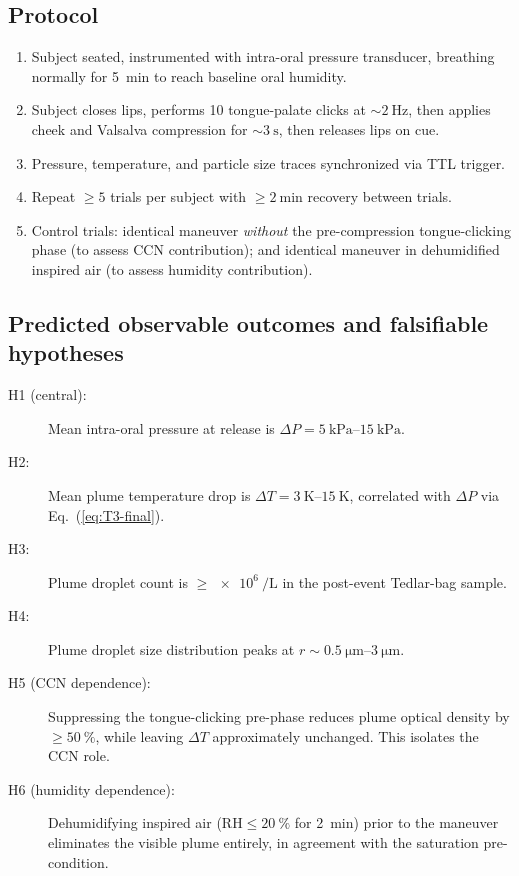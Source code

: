 \documentclass[11pt,a4paper]{article}
\theoremstyle{definition}
\theoremstyle{plain}
\begin{document}
\subsection{Protocol}

\begin{enumerate}
  \item Subject seated, instrumented with intra-oral pressure transducer, breathing normally for \SI{5}{\minute} to reach baseline oral humidity.
  \item Subject closes lips, performs 10 tongue-palate clicks at $\sim\!\SI{2}{\hertz}$, then applies cheek and Valsalva compression for $\sim\!\SI{3}{\second}$, then releases lips on cue.
  \item Pressure, temperature, and particle size traces synchronized via TTL trigger.
  \item Repeat $\ge 5$ trials per subject with $\ge \SI{2}{\minute}$ recovery between trials.
  \item Control trials: identical maneuver \emph{without} the pre-compression tongue-clicking phase (to assess CCN contribution); and identical maneuver in dehumidified inspired air (to assess humidity contribution).
\end{enumerate}

\subsection{Predicted observable outcomes and falsifiable hypotheses}

\begin{description}
  \item[H1 (central):] Mean intra-oral pressure at release is $\Delta P = \SIrange{5}{15}{\kilo\pascal}$.
  \item[H2:] Mean plume temperature drop is $\Delta T = \SIrange{3}{15}{\kelvin}$, correlated with $\Delta P$ via Eq.~(\ref{eq:T3-final}).
  \item[H3:] Plume droplet count is $\ge \SI{e6}{\per\liter}$ in the post-event Tedlar-bag sample.
  \item[H4:] Plume droplet size distribution peaks at $r \sim \SIrange{0.5}{3}{\micro\meter}$.
  \item[H5 (CCN dependence):] Suppressing the tongue-clicking pre-phase reduces plume optical density by $\ge \SI{50}{\percent}$, while leaving $\Delta T$ approximately unchanged. This isolates the CCN role.
  \item[H6 (humidity dependence):] Dehumidifying inspired air ($\mathrm{RH} \le \SI{20}{\percent}$ for \SI{2}{\minute}) prior to the maneuver eliminates the visible plume entirely, in agreement with the saturation pre-condition.
\end{description}
\end{document}

